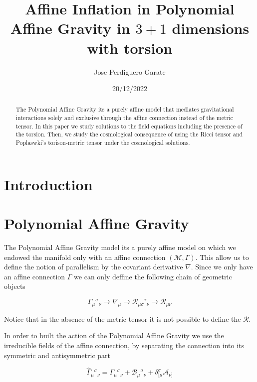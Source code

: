 \documentclass[10pt,a4paper]{article}
\title{Affine Inflation in Polynomial Affine Gravity in $3+1$ dimensions with torsion}
\author{Jose Perdiguero Garate}
\date{20/12/2022}
\begin{document}
\maketitle

\begin{abstract}
  The Polynomial Affine Gravity its a purely affine model that mediates gravitational interactions solely and exclusive through the
  affine connection instead of the metric tensor. In this paper we study solutions to the field equations including the presence of the torsion.
  Then, we study the cosmological consequence of using the Ricci tensor and Poplaswki's torison-metric tensor under the cosmological solutions.
\end{abstract}

\tableofcontents

\section{Introduction}


\section{Polynomial Affine Gravity}

The Polynomial Affine Gravity model its a purely affine model on which we endowed the manifold only with an affine connection 
$(\mathcal{M}, \Gamma)$. This allow us to define the notion of parallelism by the covariant derivative $\nabla$. Since we only
have an affine connection $\Gamma$ we can only deffine the following chain of geometric objects

\begin{equation}
  \Gamma_{\mu}{}^{\sigma}{}_{\nu} \to
  \nabla_\mu \to \mathcal{R}_{\mu\sigma}{}^{\tau}{}_{\nu} \to \mathcal{R}_{\mu\nu}  
\end{equation} 

Notice that in the absence of the metric tensor it is not possible to define the $\mathcal{R}$.

In order to built the action of the Polynomial Affine Gravity we use the irreducible fields of the affine connection,
by separating the connection into its symmetric and antisymmetric part

\begin{equation}
  \hat{\Gamma}_{\mu}{}^{\sigma}{}_{\nu} = \Gamma_{\mu}{}^{\sigma}{}_{\nu} + \mathcal{B}_{\mu}{}^{\sigma}{}_{\nu} + \delta^{\sigma}_{[\mu}\mathcal{A}_{\nu]}
\end{equation}
\end{document}

